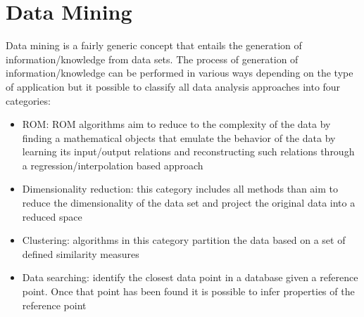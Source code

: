 \section{Data Mining}
\label{sec:dataMining}

Data mining is a fairly generic concept that entails the generation of information/knowledge 
from data sets.  The process of generation of information/knowledge can be performed in various 
ways depending on the type of application but it possible to classify all data analysis approaches 
into four categories:
\begin{itemize}
  \item ROM: ROM algorithms aim to reduce to the complexity of the data by 
        finding a mathematical objects that emulate the behavior of the data by learning its input/output 
        relations and reconstructing such relations through a regression/interpolation based approach
  \item Dimensionality reduction: this category includes all methods than aim to reduce the dimensionality 
        of the data set and project the original data into a reduced space
  \item Clustering: algorithms in this category partition the data based on a set of defined similarity measures
  \item Data searching: identify the closest data point in a database given a reference point. Once that 
        point has been found it is possible to infer properties of the reference point
\end{itemize} 

